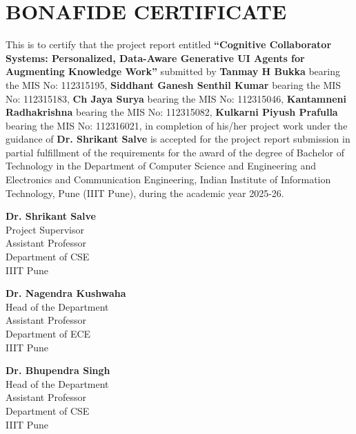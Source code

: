 \documentclass[12pt, a4paper]{report}
\begin{document}



\newpage
\chapter*{BONAFIDE CERTIFICATE}

This is to certify that the project report entitled \textbf{“Cognitive Collaborator Systems: Personalized, Data-Aware Generative UI Agents for Augmenting Knowledge Work”} submitted by \textbf{Tanmay H Bukka} bearing the MIS No: 112315195, \textbf{Siddhant Ganesh Senthil Kumar} bearing the MIS No: 112315183, \textbf{Ch Jaya Surya} bearing the MIS No: 112315046, \textbf{Kantamneni Radhakrishna} bearing the MIS No: 112315082, \textbf{Kulkarni Piyush Prafulla} bearing the MIS No: 112316021, in completion of his/her project work under the guidance of \textbf{Dr. Shrikant Salve} is accepted for the project report submission in partial fulfillment of the requirements for the award of the degree of Bachelor of Technology in the Department of Computer Science and Engineering and Electronics and Communication Engineering, Indian Institute of Information Technology, Pune (IIIT Pune), during the academic year 2025-26.

\vspace{1.5cm}

\noindent
\begin{minipage}[t]{0.32\textwidth}
    \centering
    \textbf{Dr. Shrikant Salve} \\
    Project Supervisor \\
    Assistant Professor \\
    Department of CSE \\
    IIIT Pune
\end{minipage}
\hfill
\begin{minipage}[t]{0.32\textwidth}
    \centering
    \textbf{Dr. Nagendra Kushwaha} \\
    Head of the Department \\
    Assistant Professor \\
    Department of ECE \\
    IIIT Pune
\end{minipage}
\hfill
\begin{minipage}[t]{0.32\textwidth}
    \centering
    \textbf{Dr. Bhupendra Singh} \\
    Head of the Department \\
    Assistant Professor \\
    Department of CSE \\
    IIIT Pune
\end{minipage}
\vspace{0.8cm}
\end{document}
